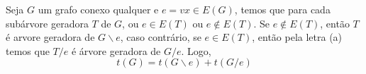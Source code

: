


 Seja $G$ um grafo conexo qualquer e $e = vx \in E(G)$, temos que para cada subárvore geradora $T$ de $G$, ou $e \in E(T)$ ou $e \notin E(T)$.
%
Se $e \notin E(T)$, então $T$ é arvore geradora de $G\backslash e$, caso contrário, se $e \in E(T)$, então pela letra (a) temos que $T/e$ é árvore geradora de $G/e$.
%
Logo, $$t(G) = t(G\backslash e) + t(G/e)$$
